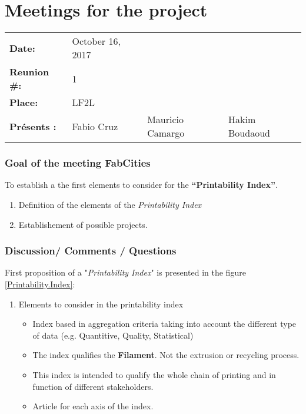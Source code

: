 \section{Meetings for the project}



\begin{flushleft}
	\begin{tabular}{l l l l}
		
		{\Large \textbf{Date:}}	& October 16, 2017 & &\\
		{\Large \textbf{Reunion \#: }} & 1 & & \\ 
		{\Large \textbf{Place: }} & LF2L & &\\ %
		{\Large \textbf{Présents : }}	& \tabitem Fabio Cruz & \tabitem Mauricio Camargo & \tabitem Hakim Boudaoud\\		
	\end{tabular}
\end{flushleft}


\subsubsection*{Goal of the meeting FabCities} 
To establish a the first elements to consider for the \textbf{``Printability Index''}.
\begin{enumerate}[noitemsep]
	\item Definition of the elements of the \textit{Printability Index}
	\item Establishement of possible projects.
\end{enumerate}


\subsubsection*{Discussion/ Comments / Questions} 

First proposition of a "\textit{Printability Index}" is presented in the figure \ref{Printability.Index}:


\begin{enumerate}[noitemsep]
	\item Elements to consider in the printability index
	\begin{itemize}
		\item Index based in aggregation criteria taking into account the different type of data (e.g. Quantitive, Quality, Statistical)
		\item The index qualifies the \textbf{Filament}. Not the extrusion or recycling process.
		\item This index is intended to qualify the whole chain of printing and in function of different stakeholders.
		\item Article for each axis of the index.
		
	\end{itemize}
\end{enumerate}


